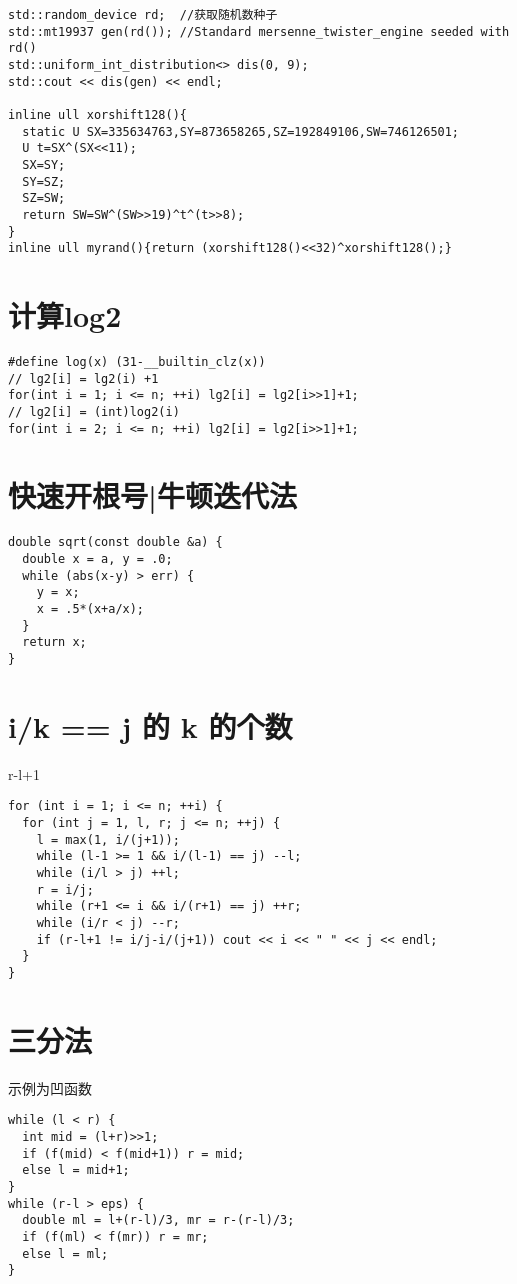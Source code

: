 \documentclass[12pt]{article}
\begin{document}
{{{{{\begin{lstlisting}
std::random_device rd;  //获取随机数种子
std::mt19937 gen(rd()); //Standard mersenne_twister_engine seeded with rd()
std::uniform_int_distribution<> dis(0, 9);
std::cout << dis(gen) << endl;

inline ull xorshift128(){
  static U SX=335634763,SY=873658265,SZ=192849106,SW=746126501;
  U t=SX^(SX<<11);
  SX=SY;
  SY=SZ;
  SZ=SW;
  return SW=SW^(SW>>19)^t^(t>>8);
}
inline ull myrand(){return (xorshift128()<<32)^xorshift128();}
\end{lstlisting}


\section{计算log2}
{\setmainfont{Consolas}
\begin{lstlisting}
#define log(x) (31-__builtin_clz(x))
// lg2[i] = lg2(i) +1
for(int i = 1; i <= n; ++i) lg2[i] = lg2[i>>1]+1;
// lg2[i] = (int)log2(i)
for(int i = 2; i <= n; ++i) lg2[i] = lg2[i>>1]+1;
\end{lstlisting}
\section{快速开根号|牛顿迭代法}
{\setmainfont{Consolas}
\begin{lstlisting}
double sqrt(const double &a) {
  double x = a, y = .0;
  while (abs(x-y) > err) {
    y = x;
    x = .5*(x+a/x);
  }
  return x;
}
\end{lstlisting}

\section{i/k == j 的 k 的个数}
r-l+1
{\setmainfont{Consolas}
\begin{lstlisting}
for (int i = 1; i <= n; ++i) {
  for (int j = 1, l, r; j <= n; ++j) {
    l = max(1, i/(j+1));
    while (l-1 >= 1 && i/(l-1) == j) --l;
    while (i/l > j) ++l;
    r = i/j;
    while (r+1 <= i && i/(r+1) == j) ++r;
    while (i/r < j) --r;
    if (r-l+1 != i/j-i/(j+1)) cout << i << " " << j << endl;
  }
}
\end{lstlisting}

\section{三分法}
示例为凹函数
{\setmainfont{Consolas}
\begin{lstlisting}
while (l < r) {
  int mid = (l+r)>>1;
  if (f(mid) < f(mid+1)) r = mid;
  else l = mid+1;
}
while (r-l > eps) {
  double ml = l+(r-l)/3, mr = r-(r-l)/3;
  if (f(ml) < f(mr)) r = mr;
  else l = ml;
}
\end{lstlisting}


}}}}}}}}}
\end{document}
